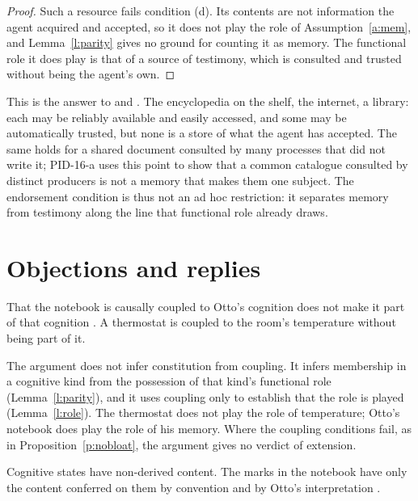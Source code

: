 \documentclass{situationist-preprint}
\begin{document}
\begin{proof}
Such a resource fails condition (d). Its contents are not information the agent acquired and accepted, so it does not play the role of Assumption~\ref{a:mem}, and Lemma~\ref{l:parity} gives no ground for counting it as memory. The functional role it does play is that of a source of testimony, which is consulted and trusted without being the agent's own.
\end{proof}

This is the answer to \citet{Rupert2004} and \citet{Sprevak2009}. The encyclopedia on the shelf, the internet, a library: each may be reliably available and easily accessed, and some may be automatically trusted, but none is a store of what the agent has accepted. The same holds for a shared document consulted by many processes that did not write it; PID-16-a uses this point to show that a common catalogue consulted by distinct producers is not a memory that makes them one subject. The endorsement condition is thus not an ad hoc restriction: it separates memory from testimony along the line that functional role already draws.

\section{Objections and replies}

\begin{objection}
That the notebook is causally coupled to Otto's cognition does not make it part of that cognition \citep{AdamsAizawa2001}. A thermostat is coupled to the room's temperature without being part of it.
\end{objection}

\begin{reply}
The argument does not infer constitution from coupling. It infers membership in a cognitive kind from the possession of that kind's functional role (Lemma~\ref{l:parity}), and it uses coupling only to establish that the role is played (Lemma~\ref{l:role}). The thermostat does not play the role of temperature; Otto's notebook does play the role of his memory. Where the coupling conditions fail, as in Proposition~\ref{p:nobloat}, the argument gives no verdict of extension.
\end{reply}

\begin{objection}
Cognitive states have non-derived content. The marks in the notebook have only the content conferred on them by convention and by Otto's interpretation \citep{AdamsAizawa2008}.
\end{objection}
\end{document}
